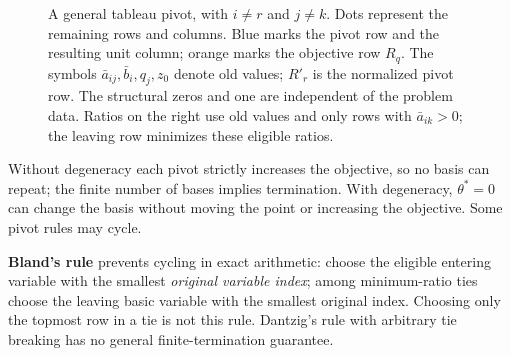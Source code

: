 \documentclass[11pt,a4paper]{article}
\begin{document}
\begin{figure}[H]
  \caption{A general tableau pivot, with $i\ne r$ and $j\ne k$.
    Dots represent the remaining rows and columns. Blue marks the pivot row
    and the resulting unit column; orange marks the objective row $R_q$.
    The symbols $\bar a_{ij},\bar b_i,q_j,z_0$ denote old values;
    $R'_r$ is the normalized pivot row.
    The structural zeros and one are independent of the problem data.
    Ratios on the right use old values and only rows with $\bar a_{ik}>0$;
    the leaving row minimizes these eligible ratios.}
  \label{fig:general-tableau-pivot}
\end{figure}
Without degeneracy each pivot strictly increases the objective, so no basis
can repeat; the finite number of bases implies termination. With degeneracy,
$\theta^*=0$ can change the basis without moving the point or increasing the
objective. Some pivot rules may cycle.

\textbf{Bland's rule} prevents cycling in exact arithmetic: choose the eligible
entering variable with the smallest \emph{original variable index}; among
minimum-ratio ties choose the leaving basic variable with the smallest original
index. Choosing only the topmost row in a tie is not this rule. Dantzig's rule
with arbitrary tie breaking has no general finite-termination guarantee.
\end{document}
